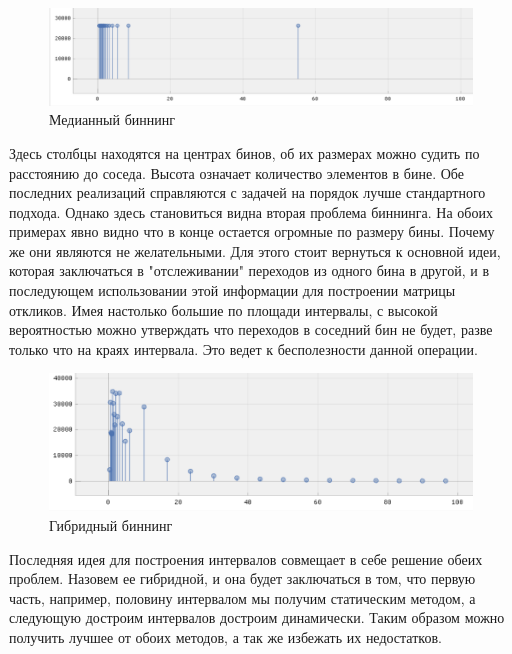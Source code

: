 \documentclass[a4paper,12pt]{diplom}
\begin{document}
 \begin{figure}[h!]
   \centering
   \includegraphics[width=\linewidth]{images/rig_median_binning.png}
   \caption{Медианный биннинг}
 \end{figure}
 

Здесь столбцы находятся на центрах бинов, об их размерах можно судить по расстоянию до соседа. Высота означает количество элементов в бине. 
Обе последних реализаций справляются с задачей на порядок лучше стандартного подхода. Однако здесь становиться видна вторая проблема биннинга.
На обоих примерах явно видно что в конце остается огромные по размеру бины. Почему же они являются не желательными. Для этого стоит вернуться к основной 
идеи, которая заключаться в "отслеживании" переходов из одного бина в другой, и в последующем использовании этой информации для построении матрицы 
откликов. Имея настолько большие по площади интервалы, с высокой вероятностью можно утверждать что переходов в соседний бин не будет, разве только
что на краях интервала. Это ведет к бесполезности данной операции.

\begin{figure}[h!]
   \centering
   \includegraphics[width=\linewidth]{images/hybrid_binningpng.png}
   \caption{Гибридный биннинг}
   \label{photo:hybrid_binning}
\end{figure}

Последняя идея для построения интервалов совмещает в себе решение обеих проблем. Назовем ее гибридной, и она будет заключаться в том, что 
первую часть, например, половину интервалом мы получим статическим методом, а следующую достроим интервалов достроим динамически. Таким образом можно получить 
лучшее от обоих методов, а так же избежать их недостатков.
\end{document}
